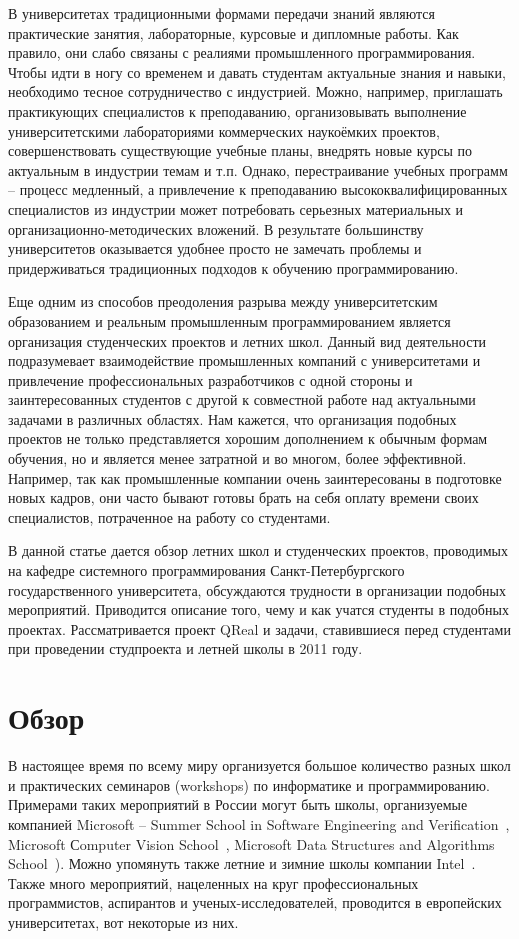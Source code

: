 \documentclass[a5paper]{article}
\begin{document}
В университетах традиционными формами передачи знаний  являются практические занятия, лабораторные, курсовые и дипломные работы. Как правило, они слабо связаны с реалиями промышленного программирования. Чтобы идти в ногу со временем и давать студентам актуальные знания и навыки, необходимо тесное сотрудничество с индустрией. Можно, например, приглашать практикующих специалистов к преподаванию, организовывать выполнение университетскими лабораториями коммерческих наукоёмких  проектов, совершенствовать существующие учебные планы, внедрять новые курсы по актуальным в индустрии темам и  т.п. Однако, перестраивание учебных программ -- процесс медленный, а привлечение к преподаванию высококвалифицированных специалистов из индустрии может потребовать серьезных материальных и организационно-методических вложений. В результате большинству университетов оказывается удобнее просто не замечать проблемы и придерживаться традиционных подходов к обучению программированию.

Еще одним из способов преодоления разрыва между университетским образованием и реальным промышленным программированием является организация студенческих проектов и летних школ. Данный вид деятельности подразумевает взаимодействие промышленных компаний с университетами и привлечение профессиональных разработчиков с одной стороны и заинтересованных студентов с другой к совместной работе над актуальными задачами в различных областях. Нам кажется, что организация подобных проектов не только представляется хорошим дополнением к обычным формам обучения, но и является менее затратной и во многом, более эффективной. Например, так как промышленные компании очень заинтересованы в подготовке новых кадров, они часто бывают готовы брать на себя оплату времени своих специалистов, потраченное на работу со студентами. 
 
В данной статье дается обзор летних школ и студенческих проектов, проводимых на кафедре системного программирования Санкт-Петербургского государственного университета, обсуждаются трудности в организации подобных мероприятий. Приводится описание того, чему и как учатся студенты в подобных проектах. Рассматривается проект QReal и задачи, ставившиеся перед студентами при проведении студпроекта и летней школы в 2011 году.

\section{Обзор}

В настоящее время по всему миру организуется большое количество разных школ и практических семинаров (workshops) по информатике и программированию. Примерами таких мероприятий в России могут быть школы, организуемые компанией Microsoft --  Summer School in Software Engineering and Verification~\cite{ms1}, Microsoft Сomputer Vision School~\cite{ms2}, Microsoft Data Structures and Algorithms School~\cite{ms3}). Можно упомянуть также  летние и зимние школы компании Intel~\cite{intel1, intel2, intel3}. Также много мероприятий, нацеленных на круг профессиональных программистов,  аспирантов и ученых-исследователей, проводится в европейских университетах, вот некоторые из них. 
\end{document}
